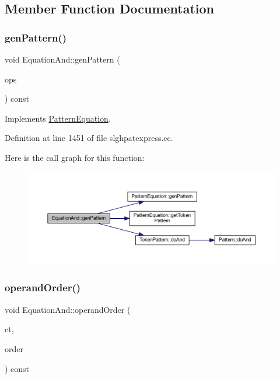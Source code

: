 \subsection{Member Function Documentation}
\mbox{\label{class_equation_and_ae32ea2fa01f596d79ead8028ff34bee4}} 
\subsubsection{\texorpdfstring{genPattern()}{genPattern()}}
{\footnotesize\ttfamily void Equation\+And\+::gen\+Pattern (\begin{DoxyParamCaption}\item[{const vector$<$ \mbox{\hyperlink{class_token_pattern}{Token\+Pattern}} $>$ \&}]{ops }\end{DoxyParamCaption}) const\hspace{0.3cm}{\ttfamily [virtual]}}



Implements \mbox{\hyperlink{class_pattern_equation_a9838e5bfe5b6013c99567628a6364bfd}{Pattern\+Equation}}.



Definition at line 1451 of file slghpatexpress.\+cc.

Here is the call graph for this function\+:
\nopagebreak
\begin{figure}[H]
\begin{center}
\leavevmode
\includegraphics[width=350pt]{class_equation_and_ae32ea2fa01f596d79ead8028ff34bee4_cgraph}
\end{center}
\end{figure}
\mbox{\label{class_equation_and_a6afd29fe0c292441a2fb1edf671ba5ef}} 
\subsubsection{\texorpdfstring{operandOrder()}{operandOrder()}}
{\footnotesize\ttfamily void Equation\+And\+::operand\+Order (\begin{DoxyParamCaption}\item[{\mbox{\hyperlink{class_constructor}{Constructor}} $\ast$}]{ct,  }\item[{vector$<$ \mbox{\hyperlink{class_operand_symbol}{Operand\+Symbol}} $\ast$ $>$ \&}]{order }\end{DoxyParamCaption}) const\hspace{0.3cm}{\ttfamily [virtual]}}



